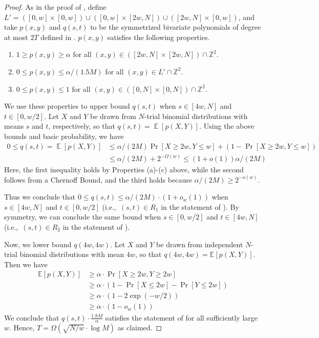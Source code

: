 \documentclass[10pt,a4paper]{article}
\newcommand{\<}{\langle}
\renewcommand{\>}{\rangle}
\DeclareMathOperator{\E}{\mathbb E}
\begin{document}
\begin{proof}
As in the proof of , define $L' = ([0, w] \times [0, w]) \cup ([0, w] \times [2w, N]) \cup ([2w, N] \times [0, w])$, and
take $p(x,y)$ and $q(s, t)$ to be the symmetrized bivariate polynomials of degree at most $2T$ defined in . $p(x, y)$ satisfies the following 
properties. 
\begin{enumerate}
\item[(a)] $1 \ge p(x, y) \ge \alpha$ for all $(x, y) \in \left([2w, N] \times [2w, N]\right) \cap \mathbb{Z}^2$.
\item[(b)] $0 \le p(x, y) \le \alpha/(1.5 M)$ for all $(x, y) \in L' \cap \mathbb{Z}^2$.
\item[(c)] $0 \leq p(x,y) \leq 1$ for all $(x, y) \in \left( [0,N] \times [0, N]\right) \cap \mathbb{Z}^2$.
\end{enumerate}


We use these properties to upper bound $q(s, t)$ when $s \in [4w, N]$ and $t \in [0, w/2]$. Let $X$ and $Y$ be drawn from $N$-trial binomial distributions with means $s$ and $t$, respectively,
so that $q(s, t) = \E[p(X,Y)]$. Using the above bounds and basic probability, we have 
\begin{align*}
0 \leq q(s, t)=\E[p(X,Y)] &\le \alpha/(2M) \Pr[X \ge 2w, Y \le w]  + 
(1-\Pr[X \ge 2w, Y \le w])
\\
&\le  \alpha/(2M) + 2^{-\Omega(w)} \leq (1+o(1)) \alpha/(2 M)
\end{align*}
Here, the first inequality holds by Properties (a)-(c) above,
while the second follows from a Chernoff Bound, and the third holds because
$\alpha/(2 M) \geq 2^{-o(w)}$.

Thus we conclude that $0 \le q(s, t) \le \alpha/(2M) \cdot (1 + o_w(1))$ when $s \in [4w, N]$ and $t \in [0, w/2]$ (i.e.,\ $(s, t) \in R_1$ in the statement of ). By symmetry, we can conclude the same bound when $s \in [0, w/2]$ and $t \in [4w, N]$ (i.e.,\ $(s, t) \in R_2$ in the statement of ).

Now, we lower bound $q(4w, 4w)$. Let $X$ and $Y$ be drawn from independent $N$-trial binomial distributions with mean $4w$, so that $q(4w, 4w) = \mathbb{E}\left[p(X,Y)\right]$. Then we have 
\begin{align*}
\mathbb{E}\left[p(X,Y)\right] &\ge \alpha \cdot \Pr[X \ge 2w, Y \ge 2w]\\
&\ge \alpha \cdot \left(1 - \Pr[X \le 2w] - \Pr[Y \le 2w]\right)\\
&\ge \alpha \cdot \left(1 - 2\exp(-w/2)\right)\\
&\ge \alpha \cdot (1 - o_w(1))
\end{align*}
We conclude that $q(s, t) \cdot \frac{1.8 M}{\alpha}$ satisfies the statement of  for all sufficiently large $w$.
Hence, $T = \Omega\left(\sqrt{N/w} \cdot \log M\right)$ as claimed.
\end{proof}
\end{document}
